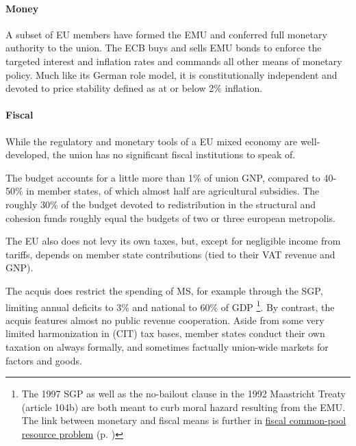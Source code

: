 \documentclass[11pt,a4paper,oneside,openright]{article}
\begin{document}
\paragraph{Money} A subset of \gls{EU} members have formed the \gls{EMU} and conferred full monetary authority to the union. 
The \gls{ECB} buys and sells \gls{EMU} bonds to enforce the targeted interest and inflation rates and commands all other means of monetary policy. 
Much like its German role model, it is constitutionally independent and devoted to price stability defined as at or below 2\% inflation. %

\paragraph{Fiscal} While the regulatory and monetary tools of a \gls{EU} mixed economy are well-developed, the union has no significant fiscal institutions to speak of. 


The budget accounts for a little more than 1\% of union \gls{GNP}, compared to 40-50\% in member states, of which almost half are agricultural subsidies. 
The roughly 30\% of the budget devoted to redistribution in the structural and cohesion funds roughly equal the budgets of two or three european metropolis. %

The \gls{EU} also does not levy its own taxes, but, except for negligible income from tariffs, depends on member state contributions (tied to their \gls{VAT} revenue and \gls{GNP}). 

The acquis does restrict the spending of \gls{MS}, for example through the \gls{SGP}, limiting annual deficits to 3\% and national to 60\% of \gls{GDP}
	\footnote{
		The 1997 \gls{SGP} as well as the no-bailout clause in the 1992 Maastricht Treaty (article 104b) are both meant to curb moral hazard resulting from the \gls{EMU}. 
		The link between monetary and fiscal means is further in \hyperref[sec:fiscal-CPR]{fiscal common-pool resource problem} (p. \pageref{sec:fiscal-CPR})
	}.%
By contrast, the acquis features almost no public revenue cooperation. 
Aside from some very limited harmonization in (\gls{CIT}) tax bases, member states conduct their own taxation on always formally, and sometimes factually union-wide markets for factors and goods.
\end{document}
